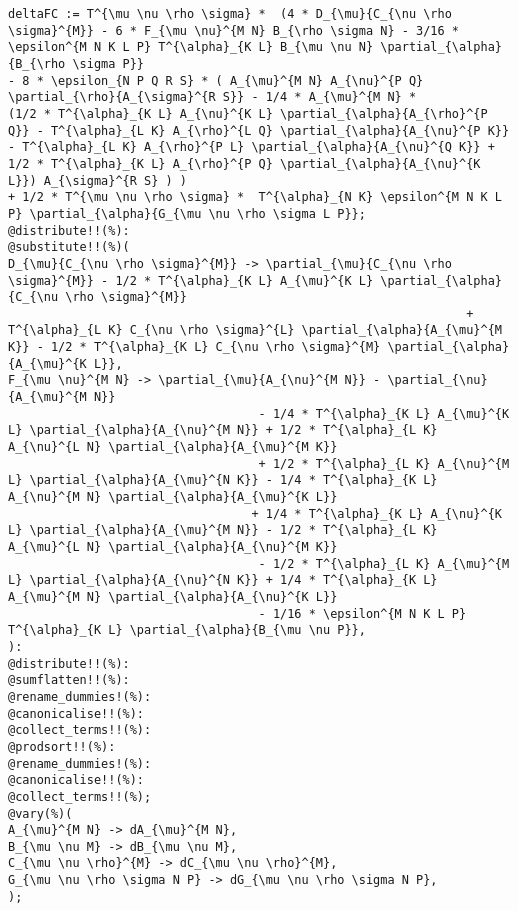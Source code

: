 \documentclass[11pt]{article}
\begin{document}
{\color[named]{Blue}\begin{verbatim}
deltaFC := T^{\mu \nu \rho \sigma} *  (4 * D_{\mu}{C_{\nu \rho \sigma}^{M}} - 6 * F_{\mu \nu}^{M N} B_{\rho \sigma N} - 3/16 * \epsilon^{M N K L P} T^{\alpha}_{K L} B_{\mu \nu N} \partial_{\alpha}{B_{\rho \sigma P}}
- 8 * \epsilon_{N P Q R S} * ( A_{\mu}^{M N} A_{\nu}^{P Q} \partial_{\rho}{A_{\sigma}^{R S}} - 1/4 * A_{\mu}^{M N} * 
(1/2 * T^{\alpha}_{K L} A_{\nu}^{K L} \partial_{\alpha}{A_{\rho}^{P Q}} - T^{\alpha}_{L K} A_{\rho}^{L Q} \partial_{\alpha}{A_{\nu}^{P K}}
- T^{\alpha}_{L K} A_{\rho}^{P L} \partial_{\alpha}{A_{\nu}^{Q K}} + 1/2 * T^{\alpha}_{K L} A_{\rho}^{P Q} \partial_{\alpha}{A_{\nu}^{K L}}) A_{\sigma}^{R S} ) )
+ 1/2 * T^{\mu \nu \rho \sigma} *  T^{\alpha}_{N K} \epsilon^{M N K L P} \partial_{\alpha}{G_{\mu \nu \rho \sigma L P}};
@distribute!!(%):
@substitute!!(%)(
D_{\mu}{C_{\nu \rho \sigma}^{M}} -> \partial_{\mu}{C_{\nu \rho \sigma}^{M}} - 1/2 * T^{\alpha}_{K L} A_{\mu}^{K L} \partial_{\alpha}{C_{\nu \rho \sigma}^{M}}
                                                                + T^{\alpha}_{L K} C_{\nu \rho \sigma}^{L} \partial_{\alpha}{A_{\mu}^{M K}} - 1/2 * T^{\alpha}_{K L} C_{\nu \rho \sigma}^{M} \partial_{\alpha}{A_{\mu}^{K L}},
F_{\mu \nu}^{M N} -> \partial_{\mu}{A_{\nu}^{M N}} - \partial_{\nu}{A_{\mu}^{M N}}
                                   - 1/4 * T^{\alpha}_{K L} A_{\mu}^{K L} \partial_{\alpha}{A_{\nu}^{M N}} + 1/2 * T^{\alpha}_{L K} A_{\nu}^{L N} \partial_{\alpha}{A_{\mu}^{M K}}
                                   + 1/2 * T^{\alpha}_{L K} A_{\nu}^{M L} \partial_{\alpha}{A_{\mu}^{N K}} - 1/4 * T^{\alpha}_{K L} A_{\nu}^{M N} \partial_{\alpha}{A_{\mu}^{K L}}
                                  + 1/4 * T^{\alpha}_{K L} A_{\nu}^{K L} \partial_{\alpha}{A_{\mu}^{M N}} - 1/2 * T^{\alpha}_{L K} A_{\mu}^{L N} \partial_{\alpha}{A_{\nu}^{M K}}
                                   - 1/2 * T^{\alpha}_{L K} A_{\mu}^{M L} \partial_{\alpha}{A_{\nu}^{N K}} + 1/4 * T^{\alpha}_{K L} A_{\mu}^{M N} \partial_{\alpha}{A_{\nu}^{K L}}
                                   - 1/16 * \epsilon^{M N K L P} T^{\alpha}_{K L} \partial_{\alpha}{B_{\mu \nu P}},
):
@distribute!!(%):
@sumflatten!!(%):
@rename_dummies!(%):
@canonicalise!!(%):
@collect_terms!!(%):
@prodsort!!(%):
@rename_dummies!(%):
@canonicalise!!(%):
@collect_terms!!(%);
@vary(%)(
A_{\mu}^{M N} -> dA_{\mu}^{M N},
B_{\mu \nu M} -> dB_{\mu \nu M},
C_{\mu \nu \rho}^{M} -> dC_{\mu \nu \rho}^{M},
G_{\mu \nu \rho \sigma N P} -> dG_{\mu \nu \rho \sigma N P},
);
\end{verbatim}}
\end{document}
